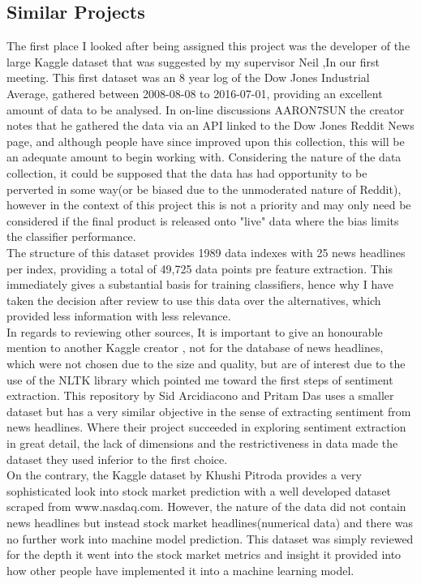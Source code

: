 \documentclass[11pt, a4paper]{article}
\begin{document}
\subsection{Similar Projects}
The first place I looked after being assigned this project was the developer of the large Kaggle dataset \cite{kaggleMain} that was suggested by my supervisor Neil ,In our first meeting. This first dataset was an 8 year log of the Dow Jones Industrial Average, gathered between 2008-08-08 to 2016-07-01, providing an excellent amount of data to be analysed. In on-line discussions AARON7SUN the creator notes that he gathered the data via an API linked to the Dow Jones Reddit News page, and although people have since improved upon this collection, this will be an adequate amount to begin working with. Considering the nature of the data collection, it could be supposed that the data has had opportunity to be perverted in some way(or be biased due to the unmoderated nature of Reddit), however in the context of this project this is not a priority and may only need be considered if the final product is released onto "live" data where the bias limits the classifier performance.\\

The structure of this dataset provides 1989 data indexes with 25 news headlines per index, providing a total of 49,725 data points pre feature extraction. This immediately gives a substantial basis for training classifiers, hence why I have taken the decision after review to use this data over the alternatives, which provided less information with less relevance.\\ 

In regards to reviewing other sources, It is important to give an honourable mention to another Kaggle creator \cite{KaggleRej1}, not for the database of news headlines, which were not chosen due to the size and quality, but are of interest due to the use of the NLTK library which pointed me toward the first steps of sentiment extraction. This repository by Sid Arcidiacono and Pritam Das uses a smaller dataset but has a very similar objective in the sense of extracting sentiment from news headlines. Where their project succeeded in exploring sentiment extraction in great detail, the lack of dimensions and the restrictiveness in data made the dataset they used inferior to the first choice.
\\
On the contrary, the Kaggle dataset by Khushi Pitroda \cite{KaggleRej2} provides a very sophisticated look into stock market prediction with a well developed dataset scraped from www.nasdaq.com. However, the nature of the data did not contain news headlines but instead stock market headlines(numerical data) and there was no further work into machine model prediction. This dataset was simply reviewed for the depth it went into the stock market metrics and insight it provided into how other people have implemented it into a machine learning model\cite{KaggleRej3}.
\end{document}
